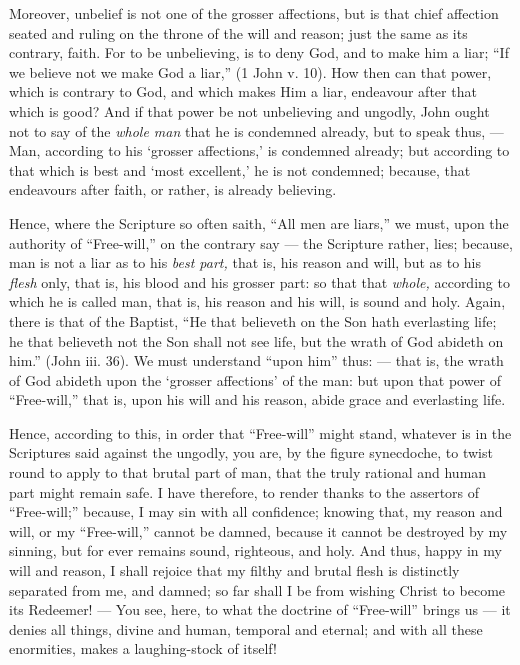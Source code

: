 Moreover, unbelief is not one of the grosser affections, but is that chief affection seated and ruling on the throne of the will and reason; just the same as its contrary, faith. For to be unbelieving, is to deny God, and to make him a liar; “If we believe not we make God a liar,” (1 John v. 10). How then can that power, which is contrary to God, and which makes Him a liar, endeavour after that which is good? And if that power be not unbelieving and ungodly, John ought not to say of the \emph{whole man }that he is condemned already, but to speak thus, — Man, according to his ‘grosser affections,’ is condemned already; but according to that which is best and ‘most excellent,’ he is not condemned; because, that endeavours after faith, or rather, is already believing.

Hence, where the Scripture so often saith, “All men are liars,” we must, upon the authority of “Free-will,” on the contrary say — the Scripture rather, lies; because, man is not a liar as to his \emph{best part, }that is, his reason and will, but as to his \emph{flesh }only, that is, his blood and his grosser part: so that that \emph{whole, }according to which he is called man, that is, his reason and his will, is sound and holy. Again, there is that of the Baptist, “He that believeth on the Son hath everlasting life; he that believeth not the Son shall not see life, but the wrath of God abideth on him.” (John iii. 36). We must understand “upon him” thus: — that is, the wrath of God abideth upon the ‘grosser affections’ of the man: but upon that power of “Free-will,” that is, upon his will and his reason, abide grace and everlasting life.

Hence, according to this, in order that “Free-will” might stand, whatever is in the Scriptures said against the ungodly, you are, by the figure synecdoche, to twist round to apply to that brutal part of man, that the truly rational and human part might remain safe. I have therefore, to render thanks to the assertors of “Free-will;” because, I may sin with all confidence; knowing that, my reason and will, or my “Free-will,” cannot be damned, because it cannot be destroyed by my sinning, but for ever remains sound, righteous, and holy. And thus, happy in my will and reason, I shall rejoice that my filthy and brutal flesh is distinctly separated from me, and damned; so far shall I be from wishing Christ to become its Redeemer! — You see, here, to what the doctrine of “Free-will” brings us — it denies all things, divine and human, temporal and eternal; and with all these enormities, makes a laughing-stock of itself!

